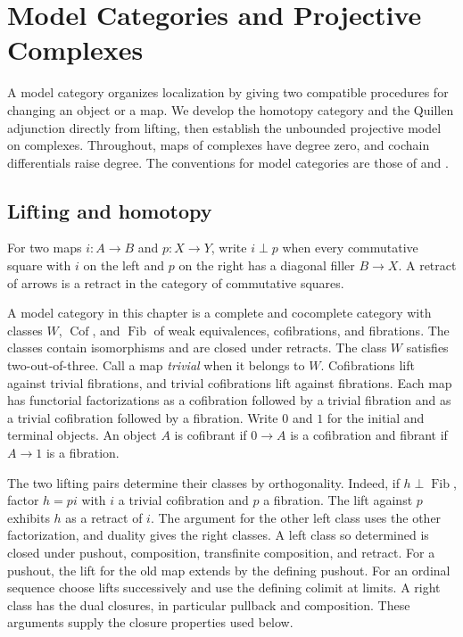 \chapter{Model Categories and Projective Complexes}
\label{ch:model-categories}

A model category organizes localization by giving two compatible
procedures for changing an object or a map. We develop the homotopy
category and the Quillen adjunction directly from lifting, then establish
the unbounded projective model on complexes. Throughout, maps of
complexes have degree zero, and cochain differentials raise degree.
The conventions for model categories are those of \cite[Chapter 1]{hovey}
and \cite[Section 11.3]{riehl}.

\section{Lifting and homotopy}

For two maps \(i:A\to B\) and \(p:X\to Y\), write \(i\perp p\)
when every commutative square with \(i\) on the left and \(p\) on
the right has a diagonal filler \(B\to X\). A retract of arrows is
a retract in the category of commutative squares.

\begin{definition}\label{res:Q01}
A model category in this chapter is a complete and cocomplete category
with classes \(W\), \(\operatorname{Cof}\), and \(\operatorname{Fib}\)
of weak equivalences, cofibrations, and fibrations. The classes contain
isomorphisms and are closed under retracts. The class \(W\) satisfies
two-out-of-three. Call a map \emph{trivial} when it belongs to \(W\).
Cofibrations lift against trivial fibrations, and trivial cofibrations
lift against fibrations. Each map has functorial factorizations as a
cofibration followed by a trivial fibration and as a trivial cofibration
followed by a fibration.
Write \(0\) and \(1\) for the initial and terminal objects. An object
\(A\) is cofibrant if \(0\to A\) is a cofibration and fibrant if
\(A\to1\) is a fibration.
\end{definition}

The two lifting pairs determine their classes by orthogonality. Indeed,
if \(h\perp\operatorname{Fib}\), factor \(h=p i\) with \(i\) a
trivial cofibration and \(p\) a fibration. The lift against \(p\)
exhibits \(h\) as a retract of \(i\). The argument for the other
left class uses the other factorization, and duality gives the
right classes. A left class so determined is closed under pushout,
composition, transfinite composition, and retract. For a pushout,
the lift for the old map extends by the defining pushout. For an
ordinal sequence choose lifts successively and use the defining
colimit at limits. A right class has the dual closures, in
particular pullback and composition. These arguments supply the
closure properties used below.

